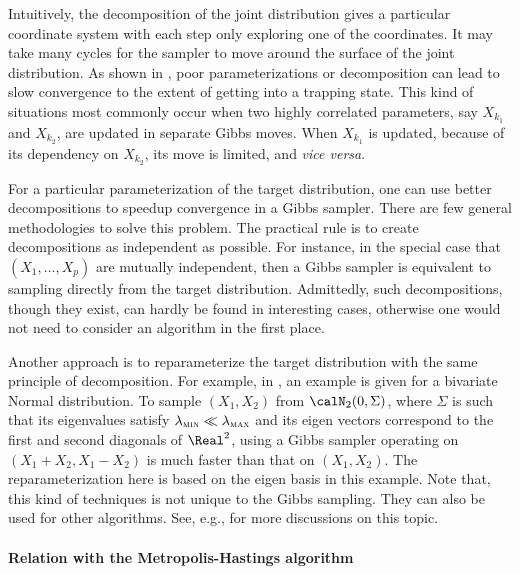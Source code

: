 Intuitively, the decomposition of the joint distribution gives a particular
coordinate system with each step only exploring one of the coordinates. It
may take many cycles for the sampler to move around the surface of the joint
distribution. As shown in \cite[][note~9.7.1]{Robert:2004tn}, poor
parameterizations or decomposition can lead to slow convergence to the extent
of getting into a trapping state. This kind of situations most commonly occur
when two highly correlated parameters, say $X_{k_1}$ and $X_{k_2}$, are
updated in separate Gibbs moves. When $X_{k_1}$ is updated, because of its
dependency on $X_{k_2}$, its move is limited, and \emph{vice versa}.

For a particular parameterization of the target distribution, one can use
better decompositions to speedup convergence in a Gibbs sampler. There are
few general methodologies to solve this problem. The practical rule is to
create decompositions as independent as possible. For instance, in the
special case that $(X_1,\dots,X_p)$ are mutually independent, then a Gibbs
sampler is equivalent to sampling directly from the target distribution.
Admittedly, such decompositions, though they exist, can hardly be found in
interesting cases, otherwise one would not need to consider an \mcmc
algorithm in the first place.

Another approach is to reparameterize the target distribution with the same
principle of decomposition. For example, in
\cite[][sec.~10.4.1]{Robert:2004tn}, an example is given for a bivariate
Normal distribution. To sample $(X_1,X_2)$ from $\calN_2(0, \Sigma)$, where
$\Sigma$ is such that its eigenvalues satisfy $\lambda_{\text{\textsc{min}}}
\ll \lambda_{\text{\textsc{max}}}$ and its eigen vectors correspond to the
first and second diagonals of $\Real^2$, using a Gibbs sampler operating on
$(X_1 + X_2, X_1 - X_2)$ is much faster than that on $(X_1,X_2)$. The
reparameterization here is based on the eigen basis in this example. Note
that, this kind of techniques is not unique to the Gibbs sampling. They can
also be used for other \mcmc algorithms. See, e.g.,
\cite{Hills:1993vb,Gilks:1996vx} for more discussions on this topic.

\paragraph{Relation with the Metropolis-Hastings algorithm}

